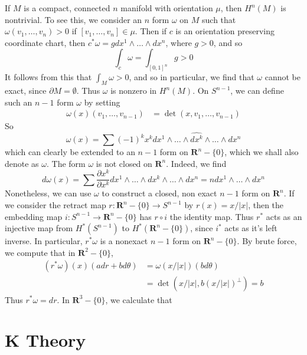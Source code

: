 \begin{example}
    If $M$ is a compact, connected $n$ manifold with orientation $\mu$, then $H^n(M)$ is nontrivial. To see this, we consider an $n$ form $\omega$ on $M$ such that $\omega(v_1, \dots, v_n) > 0$ if $[v_1, \dots, v_n] \in \mu$. Then if $c$ is an orientation preserving coordinate chart, then $c^* \omega = g dx^1 \wedge \dots \wedge dx^n$, where $g > 0$, and so
    \[ \int_c \omega = \int_{[0,1]^n} g > 0 \]
    It follows from this that $\int_M \omega > 0$, and so in particular, we find that $\omega$ cannot be exact, since $\partial M = \emptyset$. Thus $\omega$ is nonzero in $H^n(M)$. On $S^{n-1}$, we can define such an $n-1$ form $\omega$ by setting
    \begin{align*}
        \omega(x)(v_1, \dots, v_{n-1}) &= \det(x,v_1, \dots, v_{n-1})
    \end{align*}
    So
    \[ \omega(x) = \sum (-1)^k x^k dx^1 \wedge \dots \wedge \widehat{dx^k} \wedge \dots \wedge dx^n \]
    which can clearly be extended to an $n-1$ form on $\mathbf{R}^n - \{ 0 \}$, which we shall also denote as $\omega$. The form $\omega$ is not closed on $\mathbf{R}^n$. Indeed, we find
    \[ d\omega(x) = \sum \frac{\partial x^k}{\partial x^k} dx^1 \wedge \dots \wedge dx^k \wedge \dots \wedge dx^n = n dx^1 \wedge \dots \wedge dx^n \]
    Nonetheless, we can use $\omega$ to construct a closed, non exact $n-1$ form on $\mathbf{R}^n$. If we consider the retract map $r: \mathbf{R}^n - \{ 0 \} \to S^{n-1}$ by $r(x) = x/|x|$, then the embedding map $i: S^{n-1} \to \mathbf{R}^n - \{ 0 \}$ has $r \circ i$ the identity map. Thus $r^*$ acts as an injective map from $H^*(S^{n-1})$ to $H^*(\mathbf{R}^n - \{ 0 \})$, since $i^*$ acts as it's left inverse. In particular, $r^* \omega$ is a nonexact $n-1$ form on $\mathbf{R}^n - \{ 0 \}$. By brute force, we compute that in $\mathbf{R}^2 - \{ 0 \}$,
    \begin{align*}
        (r^* \omega)(x)(a dr + b d \theta) &= \omega(x/|x|)(b d \theta)\\
        & = \det(x/|x|,b(x/|x|)^\perp) = b
    \end{align*}
    Thus $r^* \omega = dr$. In $\mathbf{R}^3 - \{ 0 \}$, we calculate that
\end{example}








\chapter{K Theory}

